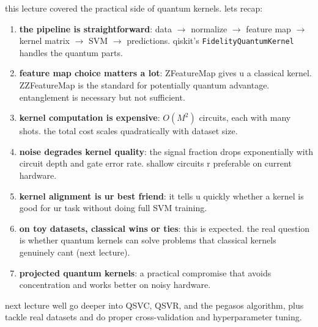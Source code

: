 \documentclass[11pt,a4paper]{article}
\theoremstyle{definition}
\theoremstyle{remark}
\begin{document}
this lecture covered the practical side of quantum kernels. lets recap:

\begin{enumerate}[leftmargin=*]
    \item \textbf{the pipeline is straightforward}: data $\to$ normalize $\to$ feature map $\to$ kernel matrix $\to$ SVM $\to$ predictions. qiskit's \texttt{FidelityQuantumKernel} handles the quantum parts.

    \item \textbf{feature map choice matters a lot}: ZFeatureMap gives u a classical kernel. ZZFeatureMap is the standard for potentially quantum advantage. entanglement is necessary but not sufficient.

    \item \textbf{kernel computation is expensive}: $O(M^2)$ circuits, each with many shots. the total cost scales quadratically with dataset size.

    \item \textbf{noise degrades kernel quality}: the signal fraction drops exponentially with circuit depth and gate error rate. shallow circuits r preferable on current hardware.

    \item \textbf{kernel alignment is ur best friend}: it tells u quickly whether a kernel is good for ur task without doing full SVM training.

    \item \textbf{on toy datasets, classical wins or ties}: this is expected. the real question is whether quantum kernels can solve problems that classical kernels genuinely cant (next lecture).

    \item \textbf{projected quantum kernels}: a practical compromise that avoids concentration and works better on noisy hardware.
\end{enumerate}

next lecture well go deeper into QSVC, QSVR, and the pegasos algorithm, plus tackle real datasets and do proper cross-validation and hyperparameter tuning.
\end{document}
